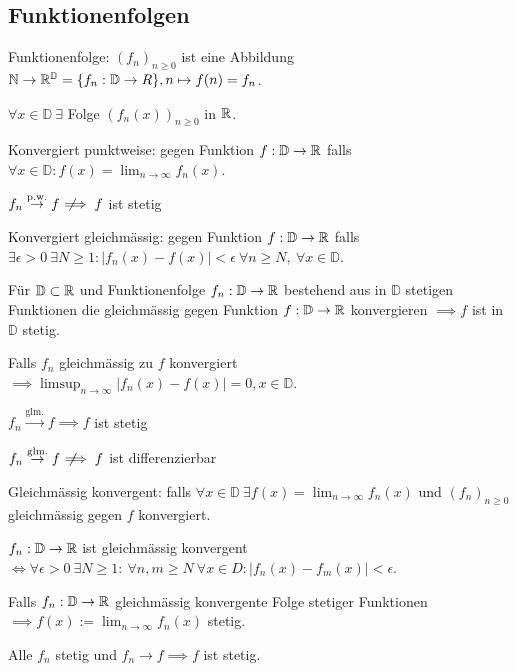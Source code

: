 \subsection{Funktionenfolgen}
\begin{compactdesc}
    \item[Funktionenfolge:] $\left( f_n \right)_{n \ge 0}$ ist eine Abbildung $\mathbb{N} \to \mathbb{R}^\mathbb{D} = \{f_n : \mathbb{D} \to R\}, n \mapsto f(n) = f_n$.
    \begin{compactitem}
        \item $\forall x \in \mathbb{D} \ \exists$ Folge $\left( f_n(x) \right)_{n \ge 0}$ in $\mathbb{R}$.
    \end{compactitem}
    \item[Konvergiert punktweise:] gegen Funktion $f: \mathbb{D} \to \mathbb{R}$ falls $\forall x \in \mathbb{D}: f(x) = \lim_{n \to \infty} f_n(x)$.
        \begin{compactitem}
            \item $f_n \overset{\text{p.w.}}{\to} f \;\not\!\!\!\implies f$ ist stetig
        \end{compactitem}
    \item[Konvergiert gleichmässig:] gegen Funktion $f: \mathbb{D} \to \mathbb{R}$ falls $\exists \epsilon > 0 \ \exists N \ge 1: \left| f_n(x) - f(x) \right| < \epsilon \ \forall n \ge N,\ \forall x \in \mathbb{D}$.
        \begin{compactitem}
            \item Für $\mathbb{D} \subset \mathbb{R}$ und Funktionenfolge $f_n:\mathbb{D} \to \mathbb{R}$ bestehend aus in $\mathbb{D}$ stetigen Funktionen die gleichmässig gegen Funktion $f: \mathbb{D} \to \mathbb{R}$ konvergieren $\implies f$ ist in $\mathbb{D}$ stetig.
            \item Falls $f_n$ gleichmässig zu $f$ konvergiert $\implies \limsup_{n \to \infty} \left| f_n(x) - f(x) \right| = 0, x \in \mathbb{D}$.
            \item $f_n \overset{\text{glm.}}{\to} f \implies f$ ist stetig
            \item $f_n \overset{\text{glm.}}{\to} f \;\not\!\!\!\implies f$ ist differenzierbar
        \end{compactitem}
    \item[Gleichmässig konvergent:] falls $\forall x \in \mathbb{D} \ \exists f(x) = \lim_{n \to \infty} f_n(x)$ und $\left( f_n \right)_{n \ge 0}$ gleichmässig gegen $f$ konvergiert.
        \begin{compactitem}
            \item $f_n : \mathbb{D} \to \mathbb{R}$ ist gleichmässig konvergent $\iff \forall \epsilon > 0 \ \exists N \ge 1: \ \forall n,m \ge N \ \forall x \in D: \left| f_n(x) - f_m(x) \right| < \epsilon$.
            \item Falls $f_n:\mathbb{D} \to \mathbb{R}$ gleichmässig konvergente Folge stetiger Funktionen $\implies f(x) := \lim_{n \to \infty} f_n(x)$ stetig.
            \item Alle $f_n$ stetig und $f_n \to f \implies f$ ist stetig.
        \end{compactitem}
\end{compactdesc}

